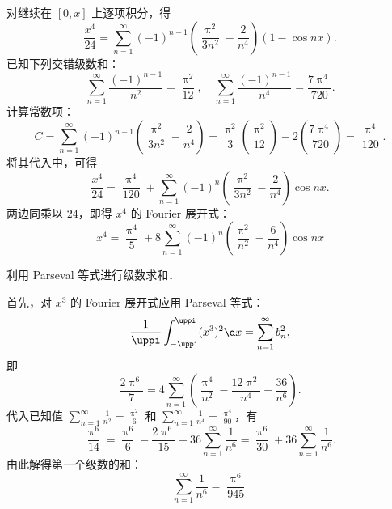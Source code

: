 \begin{solution}

    对继续在 $[0, x]$ 上逐项积分，得
    \begin{equation}\label{eq:int-x4}
        \frac{x^4}{24} = \sum_{n=1}^{\infty} (-1)^{n-1} \left( \frac{\uppi^2}{3n^2} - \frac{2}{n^4} \right) (1 - \cos nx).
    \end{equation}
    已知下列交错级数和：
    \begin{equation}\label{eq:eta2-4}
        \sum_{n=1}^{\infty} \frac{(-1)^{n-1}}{n^2} = \frac{\uppi^2}{12}, \quad \sum_{n=1}^{\infty} \frac{(-1)^{n-1}}{n^4} = \frac{7\uppi^4}{720}.
    \end{equation}
    计算常数项：
    \begin{equation}\label{eq:const-x4}
        C = \sum_{n=1}^{\infty} (-1)^{n-1} \left( \frac{\uppi^2}{3n^2} - \frac{2}{n^4} \right) = \frac{\uppi^2}{3} \left( \frac{\uppi^2}{12} \right) - 2 \left( \frac{7\uppi^4}{720} \right) = \frac{\uppi^4}{120}.
    \end{equation}
    将其代入中，可得
    \begin{equation}\label{eq:x4-fraction}
        \frac{x^4}{24} = \frac{\uppi^4}{120} + \sum_{n=1}^{\infty} (-1)^n \left( \frac{\uppi^2}{3n^2} - \frac{2}{n^4} \right) \cos nx.
    \end{equation}
    两边同乘以 $24$，即得 $x^4$ 的 Fourier 展开式：
    \begin{equation}
        \boxed{x^4 = \frac{\uppi^4}{5} + 8 \sum_{n=1}^{\infty} (-1)^n \left( \frac{\uppi^2}{n^2} - \frac{6}{n^4} \right) \cos nx}
    \end{equation}


    利用 Parseval 等式进行级数求和．

    首先，对 $x^3$ 的 Fourier 展开式应用 Parseval 等式：
    \begin{equation}\label{eq:parseval-x3}
        \frac{1}{\uppi} \int_{-\uppi}^{\uppi} (x^3)^2 \d x = \sum_{n=1}^{\infty} b_n^2,
    \end{equation}
    即
    \begin{equation}\label{eq:parseval-x3-calc}
        \frac{2\uppi^6}{7} = 4 \sum_{n=1}^{\infty} \left( \frac{\uppi^4}{n^2} - \frac{12\uppi^2}{n^4} + \frac{36}{n^6} \right).
    \end{equation}
    代入已知值 $\sum_{n=1}^{\infty} \frac{1}{n^2} = \frac{\uppi^2}{6}$ 和 $\sum_{n=1}^{\infty} \frac{1}{n^4} = \frac{\uppi^4}{90}$，有
    \begin{equation}\label{eq:parseval-x3-subs}
        \frac{\uppi^6}{14} = \frac{\uppi^6}{6} - \frac{2\uppi^6}{15} + 36 \sum_{n=1}^{\infty} \frac{1}{n^6} = \frac{\uppi^6}{30} + 36 \sum_{n=1}^{\infty} \frac{1}{n^6}.
    \end{equation}
    由此解得第一个级数的和：
    \begin{equation}
        \boxed{\sum_{n=1}^{\infty} \frac{1}{n^6} = \frac{\uppi^6}{945}}
    \end{equation}


\end{solution}
